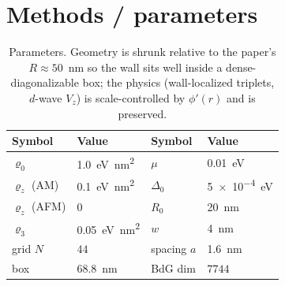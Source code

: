 \documentclass[11pt]{article}
\begin{document}
\section{Methods / parameters}
\begin{table}[h]\centering
\begin{tabular}{llll}
\toprule
Symbol & Value & Symbol & Value\\
\midrule
$\varrho_0$ & \SI{1.0}{eV.nm^2} & $\mu$ & \SI{0.01}{eV}\\
$\varrho_z$ (AM) & \SI{0.1}{eV.nm^2} & $\Delta_0$ & \SI{5e-4}{eV}\\
$\varrho_z$ (AFM) & $0$ & $R_0$ & \SI{20}{nm}\\
$\varrho_3$ & \SI{0.05}{eV.nm^2} & $w$ & \SI{4}{nm}\\
grid $N$ & $44$ & spacing $a$ & \SI{1.6}{nm}\\
box & \SI{68.8}{nm} & BdG dim & $7744$\\
\bottomrule
\end{tabular}
\caption{Parameters. Geometry is shrunk relative to the paper's $R\!\approx\!50$~nm
so the wall sits well inside a dense-diagonalizable box; the physics (wall-localized
triplets, $d$-wave $V_z$) is scale-controlled by $\phi'(r)$ and is preserved.}
\end{table}
\end{document}
